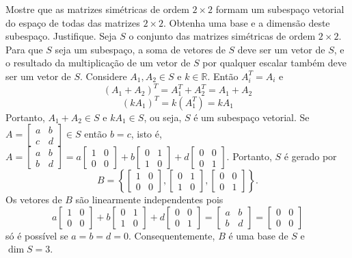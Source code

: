 \documentclass[12pt,a4paper]{article}
\newcommand*\R{\mathbb{R}}
\begin{document}
\begin{ExerciseList}
\Exercise[title={2,5}] Mostre que as matrizes simétricas de ordem $2 \times 2$ formam um subespaço vetorial do espaço de todas das matrizes $2 \times 2$. Obtenha uma base e a dimensão deste subespaço. Justifique.
\Answer Seja $S$ o conjunto das matrizes simétricas de ordem $2 \times 2$. Para que $S$ seja um subespaço, a soma de vetores de $S$ deve ser um vetor de $S$, e o resultado da multiplicação de um vetor de $S$ por qualquer escalar também deve ser um vetor de $S$. Considere $A_1, A_2 \in S$ e $k \in \R$. Então $A_i^T = A_i$ e
\[
(A_1 + A_2)^T
= A_1^T + A_2^T
= A_1 + A_2
\]
\[
  (k A_1)^T
= k (A_1^T)
= k A_1
\]
Portanto, $A_1+A_2 \in S$ e $kA_1 \in S$, ou seja, $S$ é um subespaço vetorial. Se
$A
= \begin{bmatrix}
a & b \\ c & d
\end{bmatrix}
\in S$ então $b=c$, isto é, $A
= \begin{bmatrix}
a & b \\ b & d
\end{bmatrix}
=
a \begin{bmatrix}
1 & 0 \\ 0 & 0
\end{bmatrix}
+b \begin{bmatrix}
0 & 1 \\ 1 & 0
\end{bmatrix}
+d \begin{bmatrix}
0 & 0 \\ 0 & 1
\end{bmatrix}$. Portanto, $S$ é gerado por
\[
B=
\left\{
\begin{bmatrix}
1 & 0 \\ 0 & 0
\end{bmatrix},
\begin{bmatrix}
0 & 1 \\ 1 & 0
\end{bmatrix},
\begin{bmatrix}
0 & 0 \\ 0 & 1
\end{bmatrix}
\right\}.
\]
Os vetores de $B$ são linearmente independentes pois
\[
a \begin{bmatrix}
1 & 0 \\ 0 & 0
\end{bmatrix}
+b \begin{bmatrix}
0 & 1 \\ 1 & 0
\end{bmatrix}
+d \begin{bmatrix}
0 & 0 \\ 0 & 1
\end{bmatrix}
=\begin{bmatrix}
a & b \\ b & d
\end{bmatrix}
=
\begin{bmatrix}
0 & 0 \\ 0 & 0
\end{bmatrix}
\]
só é possível se $a=b=d=0$. Consequentemente, $B$ é uma base de $S$ e $\dim S = 3$.



\end{ExerciseList}
\end{document}
